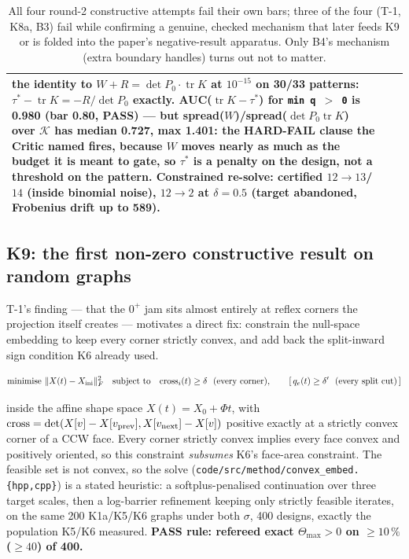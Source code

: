\documentclass[10pt,a4paper]{article}
\newcommand{\fn}[1]{\nolinkurl{#1}}
\begin{document}
\begin{table}[h]
\begin{tabular}{@{}p{9mm}p{18mm}p{115mm}@{}}
the identity to $W+R=\det P_0\cdot\operatorname{tr}K$ at $10^{-15}$ on 30/33 patterns: \(\tau^* -
\operatorname{tr}K = -R/\det P_0\) exactly. AUC($\operatorname{tr}K-\tau^*$) for
\texttt{min\,q\,$>$\,0} is 0.980 (bar 0.80, PASS) --- but \textbf{spread($W$)/spread($\det
P_0\operatorname{tr}K$) over $\mathcal K$ has median 0.727, max 1.401}: the HARD-FAIL clause the
Critic named fires, because $W$ moves nearly as much as the budget it is meant to gate, so
$\tau^*$ is a penalty on the design, not a threshold on the pattern. Constrained re-solve:
certified $12\to13$/$14$ (inside binomial noise), $12\to2$ at $\delta=0.5$ (target abandoned,
Frobenius drift up to 589). \\
\bottomrule
\end{tabular}
\caption{All four round-2 constructive attempts fail their own bars; three of the four (T-1, K8a,
B3) fail while confirming a genuine, checked mechanism that later feeds K9 or is folded into the
paper's negative-result apparatus. Only B4's mechanism (extra boundary handles) turns out not to
matter.}
\end{table}

\subsection{K9: the first non-zero constructive result on random graphs}
\label{sec:day3-k9}

T-1's finding --- that the $0^+$ jam sits almost entirely at reflex corners the projection itself
creates --- motivates a direct fix: constrain the null-space embedding to keep every corner
strictly convex, and add back the split-inward sign condition K6 already used.

\[
\text{minimise } \|X(t)-X_{\rm ini}\|_F^2 \quad\text{subject to}\quad
\mathrm{cross}_i(t)\ge\delta \ \ (\text{every corner}), \qquad
[\, q_e(t)\ge\delta' \ \ (\text{every split cut}) \,]
\]

inside the affine shape space $X(t)=X_0+\Phi t$, with $\mathrm{cross} =
\det(X[v]-X[v_{\rm prev}], X[v_{\rm next}]-X[v])$ positive exactly at a strictly convex corner of
a CCW face. Every corner strictly convex implies every face convex and positively oriented, so
this constraint \emph{subsumes} K6's face-area constraint. The feasible set is not convex, so the
solve (\fn{code/src/method/convex\_embed.{hpp,cpp}}) is a stated heuristic: a softplus-penalised
continuation over three target scales, then a log-barrier refinement keeping only strictly
feasible iterates, on the same 200 K1a/K5/K6 graphs under both $\sigma$, 400 designs, exactly the
population K5/K6 measured. \textbf{PASS rule: refereed exact $\Theta_{\max}>0$ on $\ge10\,\%$
(\(\ge40\)) of 400.}
\end{document}
